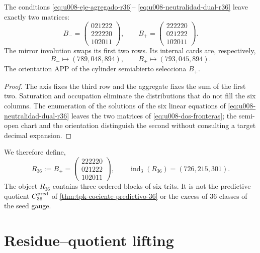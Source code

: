 \begin{proposition}
\label{prop:u008-enumeracion-r36}
The conditions \eqref{eq:u008-eje-agregado-r36}--
\eqref{eq:u008-neutralidad-dual-r36} leave exactly two matrices:
\begin{equation}
 B_-=
 \begin{pmatrix}021222\\222220\\102011\end{pmatrix},
 \qquad
 B_+=
 \begin{pmatrix}222220\\021222\\102011\end{pmatrix}.
 \label{eq:u008-dos-fronteras}
\end{equation}
The mirror involution swaps its first two rows. Its internal cards are, respectively,
\begin{equation}
 B_-\longmapsto(789,048,894),
 \qquad
 B_+\longmapsto(793,045,894).
 \label{eq:u008-cartas-frontera}
\end{equation}
The orientation APP of the cylinder semiabierto selecciona \(B_+\).
\end{proposition}

\begin{proof}
The axis fixes the third row and the aggregate fixes the sum of the first two.
Saturation and occupation eliminate the distributions that do not fill the
six columns. The enumeration of the solutions of the six linear equations
of \eqref{eq:u008-neutralidad-dual-r36} leaves the two matrices of
\eqref{eq:u008-dos-fronteras}; the semi-open chart and the orientation
distinguish the second without consulting a target decimal expansion.
\end{proof}

We therefore define,
\begin{equation}
 R_{36}:=B_+=
 \begin{pmatrix}
 222220\\
 021222\\
 102011
 \end{pmatrix},
 \qquad
 \operatorname{ind}_3(R_{36})=(726,215,301).
 \label{eq:u008-r36-construida}
\end{equation}
The object \(R_{36}\) contains three ordered blocks of six trits. It is not the
predictive quotient \(C_{36}^{\rm pred}\) of
\cref{thm:tpk-cociente-predictivo-36} or the excess of 36 classes of the seed
gauge.

\section{Residue--quotient lifting}

